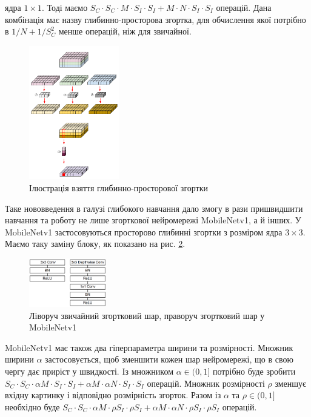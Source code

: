 ядра $1 \times 1$. Тоді маємо
$S_C \cdot  S_C \cdot  M \cdot  S_I \cdot  S_I + M \cdot  N \cdot  S_I \cdot  S_I$ операцій.
Дана комбінація має назву глибинно-просторова згортка, для
обчислення якої потрібно в $1/N + 1/S_C^2$ менше операцій, ніж
для звичайної.
\begin{figure}[H]
    \centering
    \includegraphics[width=0.35\textwidth]{images/cnn_deep_wise_separable_conv}
    \caption{Ілюстрація взяття глибинно-просторової згортки  \cite{deep_wise_sep_conv_website}
        \label{fig:cnn:deep_wise_sep_conv}
    }
\end{figure}

Таке нововведення в галузі глибокого навчання дало змогу в рази пришвидшити
навчання та роботу не лише згорткової нейромережі MobileNetv1, а й інших. У MobileNetv1 застосовуються
просторово глибинні згортки з розміром ядра $3 \times 3$.
Маємо таку заміну блоку, як показано на рис. \ref{fig:cnn:mobilenetv1_conv_layer}.

\begin{figure}[H]
    \centering
    \includegraphics[width=0.3\textwidth]{images/cnn_mobilenetv1_conv_layer}
    \caption{Ліворуч звичайний згортковий шар,
        праворуч згортковий шар у MobileNetv1  \cite{mobilenetv1}
        \label{fig:cnn:mobilenetv1_conv_layer}
    }
\end{figure}

MobileNetv1 має також два гіперпараметра ширини та розмірності.
Множник ширини $\alpha$ застосовується, щоб зменшити кожен шар нейромережі, що
в свою чергу дає приріст у швидкості.
Iз множником  $\alpha \in (0,1]$ потрібно буде зробити
$S_C \cdot  S_C \cdot  \alpha M \cdot  S_I \cdot  S_I + \alpha M \cdot  \alpha N \cdot  S_I \cdot  S_I$ операцій.
Множник розмірності $\rho$ зменшує вхідну картинку і відповідно
розмірність згорток. Разом із $\alpha$ та $\rho \in (0,1]$ необхідно буде
$S_C \cdot  S_C \cdot  \alpha M \cdot  \rho S_I \cdot  \rho S_I + \alpha M \cdot \alpha  N \cdot  \rho S_I \cdot  \rho S_I$
операцій.

